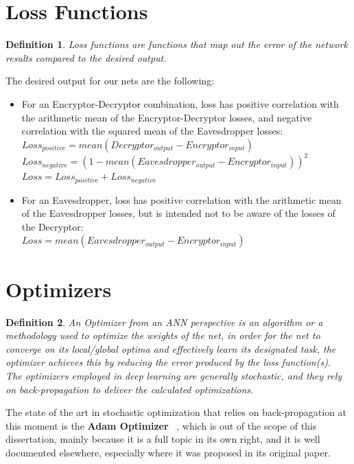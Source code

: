 \documentclass[a4paper, 12pt]{report}
\newcommand\tab[1][1cm]{\hspace*{#1}}
\newtheorem{definition}{Definition}
\begin{document}
\section{\textbf{Loss Functions}}
\begin{definition}
	Loss functions are functions that map out the error of the network results compared to the desired output.
\end{definition}
The desired output for our nets are the following:
\begin{itemize}[nosep]
	\item For an Encryptor-Decryptor combination, loss has positive correlation with the arithmetic mean of the Encryptor-Decryptor losses, and negative correlation with the squared mean of the Eavesdropper losses:\\
	\tab $ Loss_{positive} = mean(Decryptor_{output} - Encryptor_{input}) $\\
	\tab $ Loss_{negative} = (1 - mean(Eavesdropper_{output} - Encryptor_{input}))^{2} $\\
	\tab $ Loss = Loss_{positive} + Loss_{negative} $
	\item For an Eavesdropper, loss has positive correlation with the arithmetic mean of the Eavesdropper losses, but is intended not to be aware of the losses of the Decryptor:\\
	\tab $ Loss = mean(Eavesdropper_{output} - Encryptor_{input}) $
\end{itemize}
\section{\textbf{Optimizers}}
\begin{definition}
	An Optimizer from an ANN perspective is an algorithm or a methodology used to optimize the weights of the net, in order for the net to converge on its local/global optima and effectively learn its designated task, the optimizer achieves this by reducing the error produced by the loss function(s).\\
	The optimizers employed in deep learning are generally stochastic, and they rely on back-propagation to deliver the calculated optimizations. 
\end{definition}
The state of the art in stochastic optimization that relies on back-propagation at this moment is the \textbf{Adam Optimizer} ~\citep{DBLP:journals/corr/KingmaB14}, which is out of the scope of this dissertation, mainly because it is a full topic in its own right, and it is well documented elsewhere, especially where it was proposed in its original paper.
\newpage
\end{document}
